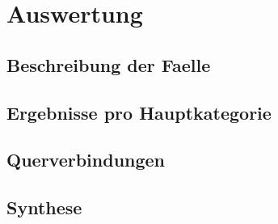 \chapter{Auswertung}\label{chap:auswertung}

\section{Beschreibung der Faelle}\label{sec:faelle}

\section{Ergebnisse pro Hauptkategorie}\label{sec:ergebnisse-pro-kategorie}

\section{Querverbindungen}\label{sec:querverbindungen}

\section{Synthese}\label{sec:synthese}
